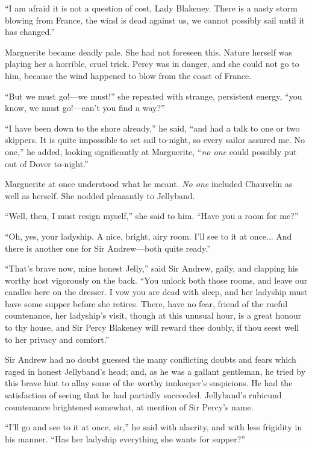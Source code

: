 \documentclass[paper=5.5in:8.5in,BCOR=7mm,twoside,DIV=calc,12pt,usegeometry,chapterprefix,endperiod,headings=big]{scrbook}
\begin{document}
\enquote{I am afraid it is not a question of cost, Lady Blakeney. There is a nasty storm blowing from France, the wind is dead against us, we cannot possibly sail until it has changed.}

Marguerite became deadly pale. She had not foreseen this. Nature herself was playing her a horrible, cruel trick. Percy was in danger, and she could not go to him, because the wind happened to blow from the coast of France.

\enquote{But we must go!---we must!} she repeated with strange, persistent energy, \enquote{you know, we must go!---can't you find a way?}

\enquote{I have been down to the shore already,} he said, \enquote{and had a talk to one or two skippers. It is quite impossible to set sail to-night, so every sailor assured me. No one,} he added, looking significantly at Marguerite, \enquote{\textit{no one} could possibly put out of Dover to-night.}

Marguerite at once understood what he meant. \textit{No one} included Chauvelin as well as herself. She nodded pleasantly to Jellyband.

\enquote{Well, then, I must resign myself,} she said to him. \enquote{Have you a room for me?}

\enquote{Oh, yes, your ladyship. A nice, bright, airy room. I'll see to it at once... And there is another one for Sir Andrew---both quite ready.}

\enquote{That's brave now, mine honest Jelly,} said Sir Andrew, gaily, and clapping his worthy host vigorously on the back. \enquote{You unlock both those rooms, and leave our candles here on the dresser. I vow you are dead with sleep, and her ladyship must have some supper before she retires. There, have no fear, friend of the rueful countenance, her ladyship's visit, though at this unusual hour, is a great honour to thy house, and Sir Percy Blakeney will reward thee doubly, if thou seest well to her privacy and comfort.}

Sir Andrew had no doubt guessed the many conflicting doubts and fears which raged in honest Jellyband's head; and, as he was a gallant gentleman, he tried by this brave hint to allay some of the worthy innkeeper's suspicions. He had the satisfaction of seeing that he had partially succeeded. Jellyband's rubicund countenance brightened somewhat, at mention of Sir Percy's name.

\enquote{I'll go and see to it at once, sir,} he said with alacrity, and with less frigidity in his manner. \enquote{Has her ladyship everything she wants for supper?}
\end{document}
